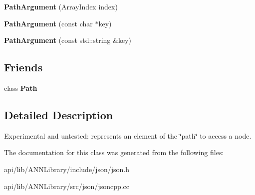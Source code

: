\begin{DoxyCompactItemize}
\item 
{\bfseries Path\+Argument} (Array\+Index index)\label{class_json_1_1_path_argument_a53c5b27143b161301b95fd544c139ecf}

\item 
{\bfseries Path\+Argument} (const char $\ast$key)\label{class_json_1_1_path_argument_a9690417a8a40e6e49f2acdf6c9281345}

\item 
{\bfseries Path\+Argument} (const std\+::string \&key)\label{class_json_1_1_path_argument_a08f872cfee4fc600f7fa3bcaaff0d41c}

\end{DoxyCompactItemize}
\subsection*{Friends}
\begin{DoxyCompactItemize}
\item 
class {\bfseries Path}\label{class_json_1_1_path_argument_a51971c24df68e5ad775ed4f8c33e968f}

\end{DoxyCompactItemize}


\subsection{Detailed Description}
Experimental and untested\+: represents an element of the \char`\"{}path\char`\"{} to access a node. 

The documentation for this class was generated from the following files\+:\begin{DoxyCompactItemize}
\item 
api/lib/\+A\+N\+N\+Library/include/json/json.\+h\item 
api/lib/\+A\+N\+N\+Library/src/json/jsoncpp.\+cc\end{DoxyCompactItemize}
